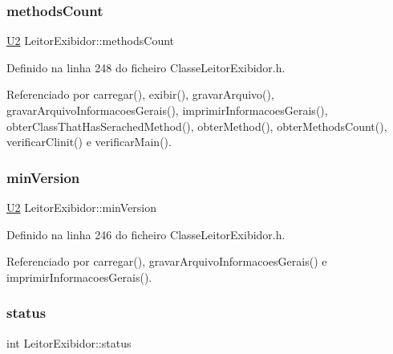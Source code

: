 \subsubsection{\texorpdfstring{methods\+Count}{methodsCount}}
{\footnotesize\ttfamily \hyperlink{BasicTypes_8h_a90240657108b1b457eef9d3f76e0202e}{U2} Leitor\+Exibidor\+::methods\+Count\hspace{0.3cm}{\ttfamily [private]}}



Definido na linha 248 do ficheiro Classe\+Leitor\+Exibidor.\+h.



Referenciado por carregar(), exibir(), gravar\+Arquivo(), gravar\+Arquivo\+Informacoes\+Gerais(), imprimir\+Informacoes\+Gerais(), obter\+Class\+That\+Has\+Serached\+Method(), obter\+Method(), obter\+Methods\+Count(), verificar\+Clinit() e verificar\+Main().

\mbox{\label{classLeitorExibidor_a6f6ac6ed85979359308c07c666316218}} 
\subsubsection{\texorpdfstring{min\+Version}{minVersion}}
{\footnotesize\ttfamily \hyperlink{BasicTypes_8h_a90240657108b1b457eef9d3f76e0202e}{U2} Leitor\+Exibidor\+::min\+Version\hspace{0.3cm}{\ttfamily [private]}}



Definido na linha 246 do ficheiro Classe\+Leitor\+Exibidor.\+h.



Referenciado por carregar(), gravar\+Arquivo\+Informacoes\+Gerais() e imprimir\+Informacoes\+Gerais().

\mbox{\label{classLeitorExibidor_ac54b88860544d66f5e8f620c4c017a37}} 
\subsubsection{\texorpdfstring{status}{status}}
{\footnotesize\ttfamily int Leitor\+Exibidor\+::status\hspace{0.3cm}{\ttfamily [private]}}



